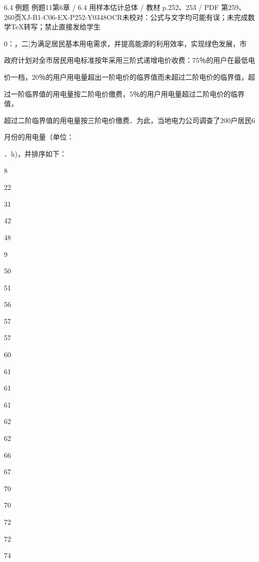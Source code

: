 \begin{bankitem}{6.4 例题 例题11}{第6章 / 6.4 用样本估计总体 / 教材 p.252、253 / PDF 第259、260页}{XJ-B1-C06-EX-P252-Y0348}{OCR未校对：公式与文字均可能有误；未完成数学TeX转写；禁止直接发给学生}
\begin{ocrdraft}
\par
0：，二]为满足居民基本用电需求，并提高能源的利用效率，实现绿色发展，市
\par
政府计划对全市居民用电标准按年采用三阶式递增电价收费：75％的用户在最低电
\par
价一档，20％的用户用电量超出一阶电价的临界值而未超过二阶电价的临界值，超
\par
过一阶临界值的用电量按二阶电价缴费，5％的用户用电量超过二阶电价的临界值，
\par
超过二阶临界值的用电量按三阶电价缴费．为此，当地电力公司调查了200户居民6
\par
月份的用电量（单位：
\par
．h)，并排序如下：
\par
8
\par
22
\par
31
\par
42
\par
48
\par
9
\par
50
\par
51
\par
56
\par
57
\par
57
\par
60
\par
61
\par
61
\par
61
\par
62
\par
62
\par
66
\par
67
\par
70
\par
70
\par
72
\par
72
\par
74
\par

\end{ocrdraft}
\end{bankitem}
